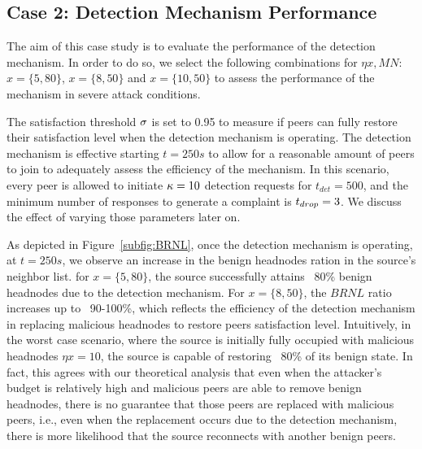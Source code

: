 \subsection{Case 2: Detection Mechanism Performance}

The aim of this case study is to evaluate the performance of the detection mechanism.
In order to do so, we select the following combinations for $\eta x, MN$: $x=\{5, 80\}$, $x=\{8, 50\}$ and $x=\{10, 50\}$ to assess the performance of the mechanism in severe attack conditions.

The satisfaction threshold $\sigma$ is set to 0.95 to measure if peers can fully restore their satisfaction level when the detection mechanism is operating.
The detection mechanism is effective starting $t=250s$ to allow for a reasonable amount of peers to join to adequately assess the efficiency of the mechanism.
In this scenario, every peer is allowed to initiate $\kappa=10$ detection requests for $t_{det}=500$, and the minimum number of responses to generate a complaint is $t_{drop}=3$. 
We discuss the effect of varying those parameters later on.

As depicted in Figure~\ref{subfig:BRNL}, once the detection mechanism is operating, at $t=250s$, we observe an increase in the benign headnodes ration in the source's neighbor list.
for $x=\{5, 80\}$, the source successfully attains ~80\% benign headnodes due to the detection mechanism.
For $x=\{8, 50\}$, the $BRNL$ ratio increases up to ~90-100\%, which reflects the efficiency of the detection mechanism in replacing malicious headnodes to restore peers satisfaction level.
Intuitively, in the worst case scenario, where the source is initially fully occupied with malicious headnodes $\eta x=10$, the source is capable of restoring ~80\% of its benign state.
In fact, this agrees with our theoretical analysis that even when the attacker's budget is relatively high and malicious peers are able to remove benign headnodes, there is no guarantee that those peers are replaced with malicious peers, 
i.e., even when the replacement occurs due to the detection mechanism, there is more likelihood that the source reconnects with another benign peers.

